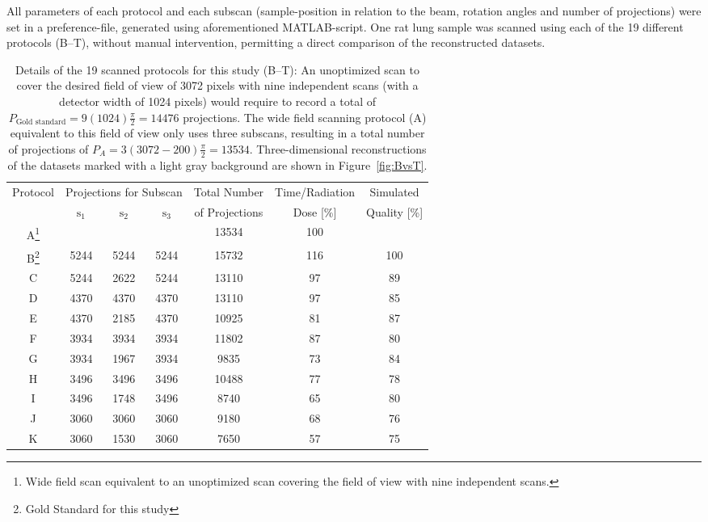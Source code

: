 All parameters of each protocol and each subscan (sample-position in relation to the beam, rotation angles and number of projections) were set in a preference-file, generated using aforementioned MATLAB-script. One rat lung sample was scanned using each of the 19 different protocols (B--T), without manual intervention, permitting a direct comparison of the reconstructed datasets.

\begin{table}
	\caption{Details of the 19 scanned protocols for this study (B--T): An unoptimized scan to cover the desired field of view of 3072 pixels with nine independent scans (with a detector width of 1024 pixels) would require to record a total of $P_{\textrm{Gold standard}}=9(1024)\frac{\pi}{2}=14476$ projections. The wide field scanning protocol (A) equivalent to this field of view only uses three subscans, resulting in a total number of projections of $P_{A} = 3(3072-200)\frac{\pi}{2}= 13534$. Three-dimensional reconstructions of the datasets marked with a light gray background are shown in Figure~\ref{fig:BvsT}.}
	\label{tab:protocols}
	\begin{tabular}{ccccccc}
		\multirow{2}{*}{Protocol} & \multicolumn{3}{c}{Projections for Subscan} & Total Number & Time/Radiation & Simulated\\
			& $\textrm{s}_{1}$ & $\textrm{s}_{2}$ & $\textrm{s}_{3}$        & of Projections & Dose [\%] & Quality [\%]\\
		\hline
		A\footnote{Wide field scan equivalent to an unoptimized scan covering the field of view with nine independent scans.} & & & & 13534 & 100 & \\
		\ifhtml\else\rowcolor{lightgray}\fi B\footnote{Gold Standard for this study} & 5244 & 5244 & 5244 & 15732 & 116 & 100\\
		C & 5244 & 2622 & 5244 & 13110 &  97 & 89\\
		D & 4370 & 4370 & 4370 & 13110 &  97 & 85\\
		E & 4370 & 2185 & 4370 & 10925 &  81 & 87\\
		F & 3934 & 3934 & 3934 & 11802 &  87 & 80\\
		G & 3934 & 1967 & 3934 & 9835  &  73 & 84\\
		H & 3496 & 3496 & 3496 & 10488 &  77 & 78\\
		I & 3496 & 1748 & 3496 & 8740  &  65 & 80\\
		J & 3060 & 3060 & 3060 & 9180  &  68 & 76\\
		K & 3060 & 1530 & 3060 & 7650  &  57 & 75\\

\end{tabular}
\end{table}
